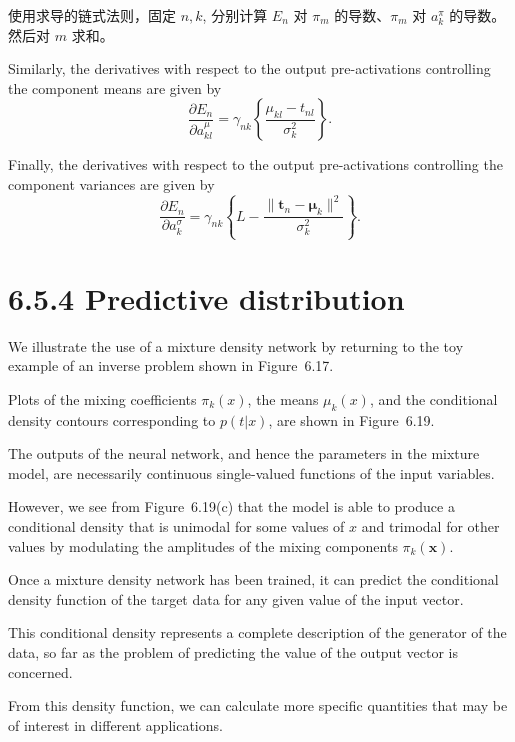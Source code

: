 \documentclass{article}
\begin{document}
{\color{red}
使用求导的链式法则，固定 $n,k$, 分别计算 $E_n$ 对 $\pi_m$ 的导数、$\pi_m$ 对 $a_k^{\pi}$ 的导数。然后对 $m$ 求和。
}

Similarly, the derivatives with respect to the output pre-activations controlling the component means are given by
\begin{equation}
\frac{\partial E_n}{\partial a_{kl}^\mu} = \gamma_{nk} \left\{ \frac{\mu_{kl} - t_{nl}}{\sigma_k^2} \right\}.
\tag{6.46}
\end{equation}

Finally, the derivatives with respect to the output pre-activations controlling the component variances are given by
\begin{equation}
\frac{\partial E_n}{\partial a_k^\sigma} = \gamma_{nk} \left\{ L - \frac{\|\mathbf{t}_n - \boldsymbol{\mu}_k\|^2}{\sigma_k^2} \right\}.
\tag{6.47}
\end{equation}

\section{6.5.4 Predictive distribution}

We illustrate the use of a mixture density network by returning to the toy example of an inverse problem shown in Figure~6.17. 

Plots of the mixing coefficients $\pi_k(x)$, the means $\mu_k(x)$, and the conditional density contours corresponding to $p(t|x)$, are shown in Figure~6.19. 

The outputs of the neural network, and hence the parameters in the mixture model, are necessarily continuous single-valued functions of the input variables. 

However, we see from Figure~6.19(c) that the model is able to produce a conditional density that is unimodal for some values of $x$ and trimodal for other values by modulating the amplitudes of the mixing components $\pi_k(\mathbf{x})$.

Once a mixture density network has been trained, it can predict the conditional density function of the target data for any given value of the input vector. 

This conditional density represents a complete description of the generator of the data, so far as the problem of predicting the value of the output vector is concerned. 

From this density function, we can calculate more specific quantities that may be of interest in different applications. 
\end{document}
